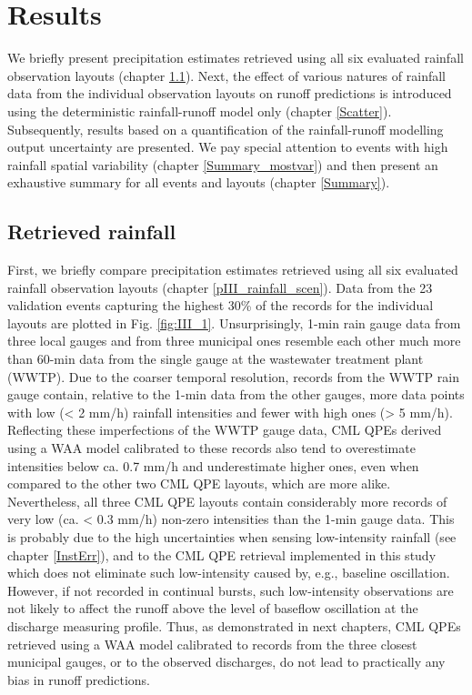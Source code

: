 \documentclass{ctuthesis}\usepackage[]{graphicx}\usepackage[]{color}
\begin{document}
\section{Results} \label{paperIIIRes}

We briefly present precipitation estimates retrieved using all six evaluated rainfall observation layouts (chapter \ref{paperIIIRes1}). Next, the effect of various natures of rainfall data from the individual observation layouts on runoff predictions is introduced using the deterministic rainfall-runoff model only (chapter \ref{Scatter}). Subsequently, results based on a quantification of the rainfall-runoff modelling output uncertainty are presented. We pay special attention to events with high rainfall spatial variability (chapter \ref{Summary_mostvar}) and then present an exhaustive summary for all events and layouts (chapter \ref{Summary}). 




\subsection{Retrieved rainfall} \label{paperIIIRes1}
First, we briefly compare precipitation estimates retrieved using all six evaluated rainfall observation layouts (chapter \ref{pIII_rainfall_scen}). Data from the 23 validation events capturing the highest 30\% of the records for the individual layouts are plotted in Fig. \ref{fig:III_1}. Unsurprisingly, 1-min rain gauge data from three local gauges and from three municipal ones resemble each other much more than 60-min data from the single gauge at the wastewater treatment plant (WWTP). Due to the coarser temporal resolution, records from the WWTP rain gauge contain, relative to the 1-min data from the other gauges, more data points with low (< 2 mm/h) rainfall intensities and fewer with high ones (> 5 mm/h). Reflecting these imperfections of the WWTP gauge data, CML QPEs derived using a WAA model calibrated to these records also tend to overestimate intensities below ca. 0.7 mm/h and underestimate higher ones, even when compared to the other two CML QPE layouts, which are more alike. Nevertheless, all three CML QPE layouts contain considerably more records of very low (ca. < 0.3 mm/h) non-zero intensities than the 1-min gauge data. This is probably due to the high uncertainties when sensing low-intensity rainfall (see chapter \ref{InstErr}), and to the CML QPE retrieval implemented in this study which does not eliminate such low-intensity  caused by, e.g., baseline oscillation. However, if not recorded in continual bursts, such low-intensity observations are not likely to affect the runoff above the level of baseflow oscillation at the discharge measuring profile. Thus, as demonstrated in next chapters, CML QPEs retrieved using a WAA model calibrated to records from the three closest municipal gauges, or to the observed discharges, do not lead to practically any bias in runoff predictions.
\end{document}

